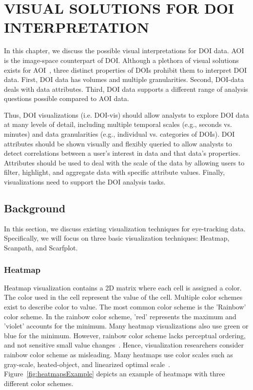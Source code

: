 \chapter{VISUAL SOLUTIONS FOR DOI INTERPRETATION}
\label{chap:DOIVis}
In this chapter, we discuss the possible visual interpretations for DOI data. AOI is the image-space counterpart of DOI. Although a plethora of visual solutions exists for AOI~\cite{Bla14}, three distinct properties of DOIs prohibit them to interpret DOI data. First, DOI data has volumes and multiple granularities. Second, DOI-data deals with data attributes. Third, DOI data supports a different range of analysis questions possible compared to AOI data. 

Thus, DOI visualizations (i.e. DOI-vis) should allow analysts to explore DOI data at many levels of detail, including multiple temporal scales (e.g., seconds vs. minutes) and data granularities (e.g., individual vs. categories of DOIs).  DOI attributes should be shown visually and flexibly queried to allow analysts to detect correlations between a user's interest in data and that data's properties. Attributes should be used to deal with the scale of the data by allowing users to filter, highlight, and aggregate data with specific attribute values. Finally, visualizations need to support the DOI analysis tasks. 



\section{Background}
\label{sec:ClassicVisualization}
In this section, we discuss existing visualization techniques for eye-tracking data. Specifically, we will focus on three basic visualization techniques: Heatmap, Scanpath, and Scarfplot. %

\subsection{Heatmap}
Heatmap visualization contains a 2D matrix where each cell is assigned a color. The color used in the cell represent the value of the cell. Multiple color schemes exist to describe color to value. The most common color scheme is the 'Rainbow' color scheme. In the rainbow color scheme, 'red' represents the maximum and 'violet' accounts for the minimum. Many heatmap visualizations also use green or blue for the minimum. However, rainbow color scheme lacks perceptual ordering, and not sensitive small value changes~\cite{borland2007rainbow}. Hence, visualization researchers consider rainbow color scheme as misleading. Many heatmaps use color scales such as gray-scale, heated-object, and linearized optimal scale~\cite{silva2007there}. Figure~\ref{fig:heatmapsExample} depicts an example of heatmaps with three different color schemes. 

